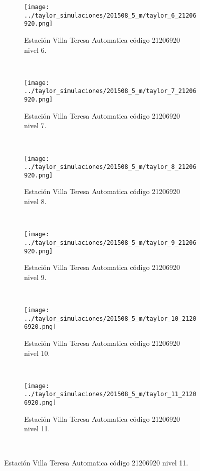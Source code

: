 \begin{figure}[H]\ContinuedFloat
\centering
\begin{subfigure}[normla]{0.4\textwidth}
\caption{Estación Villa Teresa Automatica  código 21206920 nivel 6.}
\texttt{[image: ../taylor\_simulaciones/201508\_5\_m/taylor\_6\_21206920.png]}
\end{subfigure}
~
\begin{subfigure}[normla]{0.4\textwidth}
\caption{Estación Villa Teresa Automatica  código 21206920 nivel 7.}
\texttt{[image: ../taylor\_simulaciones/201508\_5\_m/taylor\_7\_21206920.png]}
\end{subfigure}
~
\begin{subfigure}[normla]{0.4\textwidth}
\caption{Estación Villa Teresa Automatica  código 21206920 nivel 8.}
\texttt{[image: ../taylor\_simulaciones/201508\_5\_m/taylor\_8\_21206920.png]}
\end{subfigure}
~
\begin{subfigure}[normla]{0.4\textwidth}
\caption{Estación Villa Teresa Automatica  código 21206920 nivel 9.}
\texttt{[image: ../taylor\_simulaciones/201508\_5\_m/taylor\_9\_21206920.png]}
\end{subfigure}
~
\begin{subfigure}[normla]{0.4\textwidth}
\caption{Estación Villa Teresa Automatica  código 21206920 nivel 10.}
\texttt{[image: ../taylor\_simulaciones/201508\_5\_m/taylor\_10\_21206920.png]}
\end{subfigure}
~
\begin{subfigure}[normla]{0.4\textwidth}
\caption{Estación Villa Teresa Automatica  código 21206920 nivel 11.}
\texttt{[image: ../taylor\_simulaciones/201508\_5\_m/taylor\_11\_21206920.png]}
\end{subfigure}
~
\end{figure}
           
